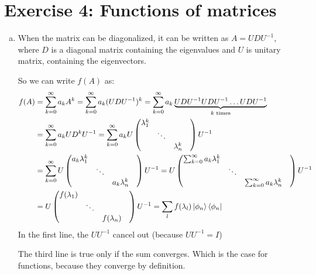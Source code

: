 \documentclass[a4paper,german,12pt,smallheadings]{scrartcl}
\begin{document}
\section*{Exercise 4: Functions of matrices}
\begin{enumerate}[a)]
  \item
    When the matrix can be diagonalized, it can be written as $A = UDU^{-1}$,
    where $D$ is a diagonal matrix containing the eigenvalues and $U$ is
    unitary matrix, containing the eigenvectors.

    So we can write $f(A)$ as:
    \begin{align*}
      f(A)
      &= \sum_{k=0}^{\infty} a_k A^k 
      = \sum_{k=0}^{\infty} a_k (UDU^{-1})^k
      = \sum_{k=0}^{\infty} a_k \underbrace{UDU^{-1}UDU^{-1} \dots UDU^{-1}}_{k\text{ times}} \\
      &= \sum_{k=0}^{\infty} a_k UD^kU^{-1}
      = \sum_{k=0}^{\infty} a_k U 
      \begin{pmatrix} 
        \lambda_1^k &             & \\
                   & \ddots      & \\
                   &             & \lambda_n^k & \\
      \end{pmatrix} 
      U^{-1} \\
      &= \sum_{k=0}^{\infty} U 
      \begin{pmatrix} 
        a_k \lambda_1^k &             & \\
                   & \ddots      & \\
                   &             & a_k\lambda_n^k & \\
      \end{pmatrix} 
      U^{-1}
      = U
      \begin{pmatrix} 
        \sum_{k=0}^{\infty }a_k \lambda_1^k &             & \\
                   & \ddots      & \\
                   &             & \sum_{k=0}^{\infty} a_k\lambda_n^k & \\
      \end{pmatrix} 
      U^{-1} \\
      &= U
      \begin{pmatrix} 
        f(\lambda_1) &             & \\
                   & \ddots      & \\
                   &             & f(\lambda_n) & \\
      \end{pmatrix} 
      U^{-1} = \sum_l f(\lambda_l) \ket{\phi_n}\bra{\phi_n}
    \end{align*}
    In the first line, the $UU^{-1}$ cancel out (because $UU^{-1} = I$)

    The third line is true only if the sum converges. Which is the case for
    functions, because they converge by definition.
\end{enumerate}
\end{document}
